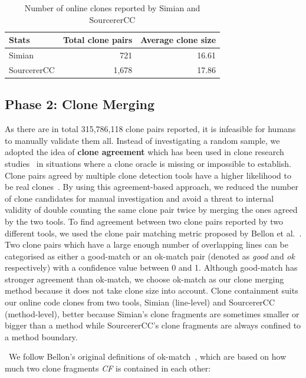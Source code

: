 \documentclass[10pt,journal,compsoc]{IEEEtran}
\begin{document}
\begin{table}
	\centering
	\caption{Number of online clones reported by Simian and SourcererCC}
	\label{tab:orig_stats}
	\begin{tabular}{lrr}
		\toprule
		Stats & \multicolumn{1}{c}{Total clone pairs} & \multicolumn{1}{c}{Average clone size} \\
		\midrule
		Simian & 721 & 16.61 \\
		SourcererCC & 1,678 & 17.86 \\
		\bottomrule
	\end{tabular} %
\end{table}

\subsection{Phase 2: Clone Merging} As there are in total 315,786,118 clone
pairs reported, it is infeasible for humans to manually validate them all.
Instead of investigating a random sample, we adopted the idea of \textbf{clone
	agreement} which has been used in clone research studies~\cite{Funaro2010,
	Wang2013,cr2016ssbse} in situations where a clone oracle is missing or
impossible to establish. Clone pairs agreed by multiple clone detection tools
have a higher likelihood to be real clones~\cite{cr2016ssbse}. By using this
agreement-based approach, we reduced the number of clone candidates for manual
investigation and avoid a threat to internal validity of double counting the
same clone pair twice by merging the ones agreed by the two tools. To find
agreement between two clone pairs reported by two different tools, we used the
clone pair matching metric proposed by Bellon et al.~\cite{Bellon2007}. Two
clone pairs which have a large enough number of overlapping lines can be
categorised as either a good-match or an ok-match pair (denoted as \textit{good}
and \textit{ok} respectively) with a confidence value between 0 and 1. Although
good-match has stronger agreement than ok-match, we choose ok-match as our clone
merging method because it does not take clone size into account. Clone containment suits our
online code clones from two tools, Simian (line-level) and SourcererCC
(method-level), better because Simian's clone fragments  are sometimes smaller or bigger than
a method while SourcererCC's clone fragments are always confined to a method boundary.

\ We follow Bellon's original definitions of ok-match~\cite{Bellon2007}, which are based on how much two clone
fragments \textit{CF} is contained in each other:
\end{document}
